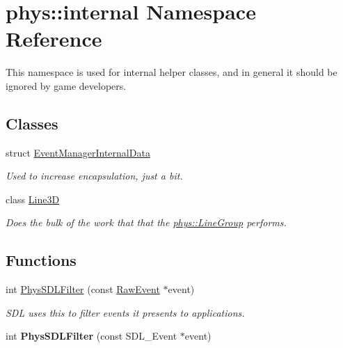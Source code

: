 \hypertarget{namespacephys_1_1internal}{
\section{phys::internal Namespace Reference}
\label{d0/d26/namespacephys_1_1internal}
}


This namespace is used for internal helper classes, and in general it should be ignored by game developers.  


\subsection*{Classes}
\begin{DoxyCompactItemize}
\item 
struct \hyperlink{structphys_1_1internal_1_1EventManagerInternalData}{EventManagerInternalData}
\begin{DoxyCompactList}\small\item\em Used to increase encapsulation, just a bit. \item\end{DoxyCompactList}\item 
class \hyperlink{classphys_1_1internal_1_1Line3D}{Line3D}
\begin{DoxyCompactList}\small\item\em Does the bulk of the work that that the \hyperlink{classphys_1_1LineGroup}{phys::LineGroup} performs. \item\end{DoxyCompactList}\end{DoxyCompactItemize}
\subsection*{Functions}
\begin{DoxyCompactItemize}
\item 
int \hyperlink{namespacephys_1_1internal_aae2a1133a05c67ac3062038c0c5dad4a}{PhysSDLFilter} (const \hyperlink{namespacephys_a8126d26e4507e66d09876988bb941fd4}{RawEvent} $\ast$event)
\begin{DoxyCompactList}\small\item\em SDL uses this to filter events it presents to applications. \item\end{DoxyCompactList}\item 
\hypertarget{namespacephys_1_1internal_a83a2949f3de29e91e9fc8d74dc2e7b6a}{
int {\bfseries PhysSDLFilter} (const SDL\_\-Event $\ast$event)}
\label{d0/d26/namespacephys_1_1internal_a83a2949f3de29e91e9fc8d74dc2e7b6a}

\end{DoxyCompactItemize}


